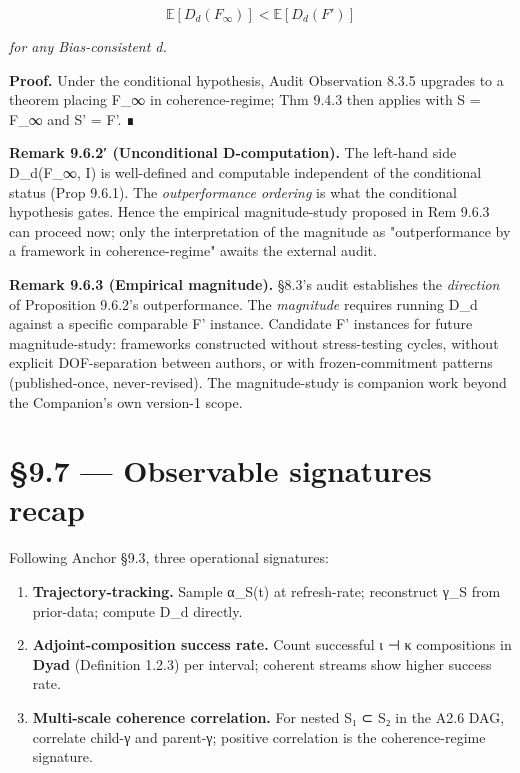\documentclass[11pt, openany]{book}
\newcommand{\sectionbreak}{\clearpage}
\begin{document}
\[
\mathbb{E}[D_d(F_\infty)] < \mathbb{E}[D_d(F')]
\]

\textit{for any Bias-consistent d.}

\textbf{Proof.} Under the conditional hypothesis, Audit Observation 8.3.5 upgrades to a theorem placing F\_\allowbreak{}∞ in coherence-regime; Thm 9.4.3 then applies with S = F\_\allowbreak{}∞ and S' = F'. ∎

\textbf{Remark 9.6.2′ (Unconditional D-computation).} The left-hand side D\_\allowbreak{}d(F\_\allowbreak{}∞, I) is well-defined and computable independent of the conditional status (Prop 9.6.1). The \textit{outperformance ordering} is what the conditional hypothesis gates. Hence the empirical magnitude-study proposed in Rem 9.6.3 can proceed now; only the interpretation of the magnitude as "outperformance by a framework in coherence-regime" awaits the external audit.

\textbf{Remark 9.6.3 (Empirical magnitude).} §8.3's audit establishes the \textit{direction} of Proposition 9.6.2's outperformance. The \textit{magnitude} requires running D\_\allowbreak{}d against a specific comparable F' instance. Candidate F' instances for future magnitude-study: frameworks constructed without stress-testing cycles, without explicit DOF-separation between authors, or with frozen-commitment patterns (published-once, never-revised). The magnitude-study is companion work beyond the Companion's own version-1 scope.

\sectionbreak

\section{§9.7 --- Observable signatures recap}

Following Anchor §9.3, three operational signatures:

\begin{enumerate}
\item \textbf{Trajectory-tracking.} Sample α\_\allowbreak{}S(t) at refresh-rate; reconstruct γ\_\allowbreak{}S from prior-data; compute D\_\allowbreak{}d directly.
\item \textbf{Adjoint-composition success rate.} Count successful ι ⊣ κ compositions in \textbf{Dyad} (Definition 1.2.3) per interval; coherent streams show higher success rate.
\item \textbf{Multi-scale coherence correlation.} For nested S₁ ⊂ S₂ in the A2.6 DAG, correlate child-γ and parent-γ; positive correlation is the coherence-regime signature.
\end{enumerate}
\end{document}
